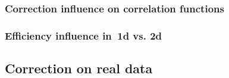 \documentclass[11pt,a4paper,twoside]{book}
\numberwithin{equation}{chapter}
\begin{document}
\subsection{Correction influence on correlation functions}


\pagebreak

\pagebreak


\subsection{Efficiency influence in 1d vs. 2d}

\section{Correction on real data}






\chapter{}
\pagestyle{fancy}





\listoffigures
\listoftables

\appendix
\end{document}
